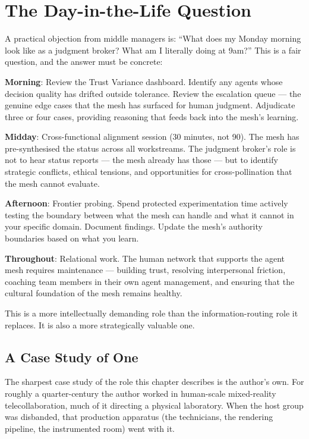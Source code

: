 \section{The Day-in-the-Life Question}

A practical objection from middle managers is: ``What does my Monday morning look like as a judgment broker? What am I literally doing at 9am?'' This is a fair question, and the answer must be concrete:

\textbf{Morning}: Review the Trust Variance dashboard. Identify any agents whose decision quality has drifted outside tolerance. Review the escalation queue --- the genuine edge cases that the mesh has surfaced for human judgment. Adjudicate three or four cases, providing reasoning that feeds back into the mesh's learning.

\textbf{Midday}: Cross-functional alignment session (30 minutes, not 90). The mesh has pre-synthesised the status across all workstreams. The judgment broker's role is not to hear status reports --- the mesh already has those --- but to identify strategic conflicts, ethical tensions, and opportunities for cross-pollination that the mesh cannot evaluate.

\textbf{Afternoon}: Frontier probing. Spend protected experimentation time actively testing the boundary between what the mesh can handle and what it cannot in your specific domain. Document findings. Update the mesh's authority boundaries based on what you learn.

\textbf{Throughout}: Relational work. The human network that supports the agent mesh requires maintenance --- building trust, resolving interpersonal friction, coaching team members in their own agent management, and ensuring that the cultural foundation of the mesh remains healthy.

This is a more intellectually demanding role than the information-routing role it replaces. It is also a more strategically valuable one.

\subsection{A Case Study of One}

The sharpest case study of the role this chapter describes is the author's own. For roughly a quarter-century the author worked in human-scale mixed-reality telecollaboration, much of it directing a physical laboratory. When the host group was disbanded, that production apparatus (the technicians, the rendering pipeline, the instrumented room) went with it.

